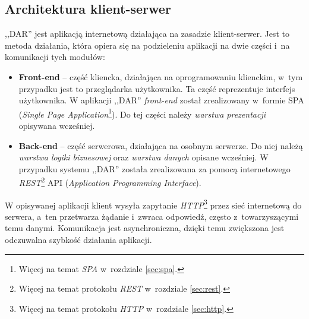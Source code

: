 \subsection{Architektura klient-serwer}
\label{sec:architekturaKlientSerwer}
,,DAR'' jest aplikacją internetową działająca na zasadzie klient-serwer. Jest to metoda działania, która opiera się na podzieleniu aplikacji na dwie części i~na komunikacji tych modułów:
\begin{itemize}
    \item \textbf{Front-end} -- część kliencka, działająca na oprogramowaniu klienckim, w~tym przypadku jest to przeglądarka użytkownika. Ta część reprezentuje interfejs użytkownika. W aplikacji ,,DAR'' \emph{front-end} został zrealizowany w~formie SPA (\emph{Single Page Application}\footnote{Więcej na temat \emph{SPA} w~rozdziale \ref{sec:spa}.}). Do tej części należy \emph{warstwa prezentacji} opisywana wcześniej.
    \item \textbf{Back-end} --  część serwerowa, działająca na osobnym serwerze. Do niej należą \emph{warstwa logiki biznesowej} oraz \emph{warstwa danych}  opisane wcześniej. W przypadku systemu ,,DAR'' została zrealizowana za pomocą internetowego \emph{REST}\footnote{Więcej na temat protokołu \emph{REST} w~rozdziale \ref{sec:rest}.} API (\emph{Application Programming Interface}). 
\end{itemize}
 W opisywanej aplikacji klient wysyła zapytanie \emph{HTTP}\footnote{Więcej na temat protokołu \emph{HTTP} w~rozdziale \ref{sec:http}.} przez sieć internetową do serwera, a~ten przetwarza żądanie i~zwraca odpowiedź, często z~towarzyszącymi temu danymi. Komunikacja jest asynchroniczna, dzięki temu zwiększona jest odczuwalna szybkość działania aplikacji.

